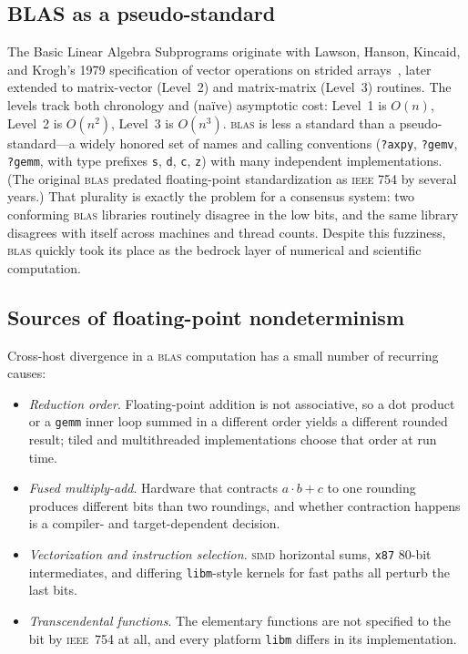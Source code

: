 \documentclass[twoside]{article}
\begin{document}
\subsection[\textsc{blas} as a pseudo-standard]{BLAS as a pseudo-standard}

The Basic Linear Algebra Subprograms originate with Lawson, Hanson, Kincaid, and Krogh's 1979 specification of vector operations on strided arrays~\citep{lawson1979blas}, later extended to matrix-vector (Level~2) and matrix-matrix (Level~3) routines.  The levels track both chronology and
(na\"{i}ve) asymptotic cost:  Level~1 is $O(n)$, Level~2 is $O(n^2)$, Level~3 is $O(n^3)$.  \textsc{blas} is less a standard than a pseudo-standard---a widely honored set of names and calling conventions (\texttt{?axpy}, \texttt{?gemv}, \texttt{?gemm}, with type prefixes \texttt{s}, \texttt{d}, \texttt{c}, \texttt{z}) with many independent implementations.  (The original \textsc{blas} predated floating-point standardization as \textsc{ieee} 754 by several years.)  That plurality is exactly the problem for a consensus system:  two conforming \textsc{blas} libraries routinely disagree in the low bits, and the same library disagrees with itself across machines and thread counts.  Despite this fuzziness, \textsc{blas} quickly took its place as the bedrock layer of numerical and scientific computation.

\subsection{Sources of floating-point nondeterminism}

Cross-host divergence in a \textsc{blas} computation has a small number of recurring causes:

\begin{itemize}
  \item  \emph{Reduction order}.  Floating-point addition is not associative, so a dot product or a \texttt{gemm} inner loop summed in a different order yields a different rounded result; tiled and multithreaded implementations choose that order at run time.
  \item  \emph{Fused multiply-add}.  Hardware that contracts $a\cdot b + c$ to one rounding produces different bits than two roundings, and whether contraction happens is a compiler- and target-dependent decision.
  \item  \emph{Vectorization and instruction selection}.  \textsc{simd} horizontal sums, \texttt{x87} 80-bit intermediates, and differing \texttt{libm}-style kernels for fast paths all perturb the last bits.
  \item  \emph{Transcendental functions}.  The elementary functions are not specified to the bit by \textsc{ieee}~754 at all, and every platform \texttt{libm} differs in its implementation.
\end{itemize}
\end{document}
